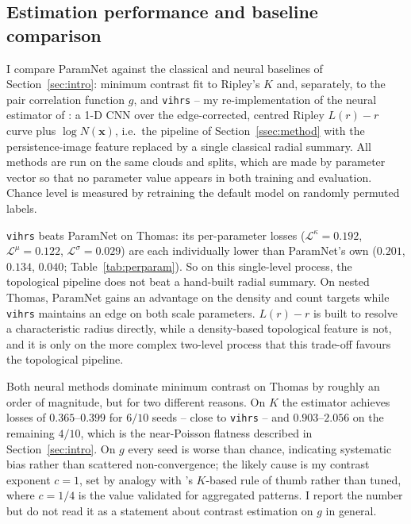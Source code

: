 \documentclass[11pt,a4paper]{article}
\newcommand{\pc}{\mathbf{x}}
\begin{document}
\subsection{Estimation performance and baseline comparison}
\label{ssec:results}

I compare ParamNet against the classical and neural baselines of
Section~\ref{sec:intro}: minimum contrast fit to Ripley's $K$ and, separately,
to the pair correlation function $g$, and \texttt{vihrs} -- my re-implementation
of the neural estimator of \citet{vihrs2022neural}: a 1-D CNN over the
edge-corrected, centred Ripley $L(r)-r$ curve plus $\log N(\pc)$, i.e.\ the
pipeline of Section~\ref{ssec:method} with the persistence-image feature
replaced by a single classical radial summary. All methods are run on the same
clouds and splits, which are made by parameter vector so that no parameter value
appears in both training and evaluation. Chance level is measured by retraining
the default model on randomly permuted labels.

\texttt{vihrs} beats ParamNet on Thomas: its per-parameter losses
($\mathcal{L}^\kappa=0.192$, $\mathcal{L}^\mu=0.122$,
$\mathcal{L}^\sigma=0.029$) are each individually lower than ParamNet's own
($0.201$, $0.134$, $0.040$; Table~\ref{tab:perparam}). So on this single-level
process, the topological pipeline does not beat a hand-built radial summary. On
nested Thomas, ParamNet gains an advantage on the density and count targets
while \texttt{vihrs} maintains an edge on both scale parameters. $L(r)-r$ is
built to resolve a characteristic radius directly, while a density-based
topological feature is not, and it is only on the more complex two-level process
that this trade-off favours the topological pipeline.

Both neural methods dominate minimum contrast on Thomas by roughly an order of
magnitude, but for two different reasons. On $K$ the estimator achieves losses
of $0.365$--$0.399$ for $6/10$ seeds -- close to \texttt{vihrs} -- and
$0.903$--$2.056$ on the remaining $4/10$, which is the near-Poisson flatness
described in Section~\ref{sec:intro}. On $g$ every seed is worse than chance,
indicating systematic bias rather than scattered non-convergence; the likely
cause is my contrast exponent $c=1$, set by analogy with
\citet{diggle2003spatial}'s $K$-based rule of thumb rather than tuned, where
$c=1/4$ is the value validated for aggregated patterns. I report the number but
do not read it as a statement about contrast estimation on $g$ in general.
\end{document}
